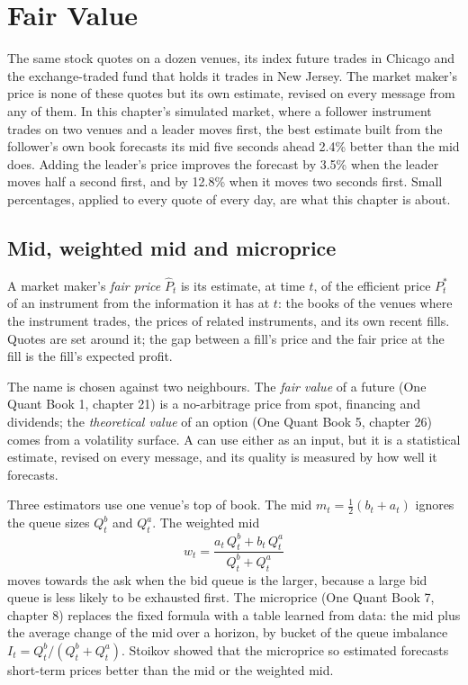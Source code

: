 \chapter{Fair Value}\label{ch:hf:fair-value}

The same stock quotes on a dozen venues, its index future trades in Chicago and the exchange-traded fund that holds it trades in New Jersey. The
market maker's price is none of these quotes but its own estimate, revised on every message from any of them. In this chapter's simulated
market, where a follower instrument trades on two venues and a leader moves first, the best estimate built from the follower's own book forecasts
its mid five seconds ahead 2.4\% better than the mid does. Adding the leader's price improves the forecast by 3.5\% when the leader moves half a
second first, and by 12.8\% when it moves two seconds first. Small percentages, applied to every quote of every day, are what this chapter is about.

\section{Mid, weighted mid and microprice}

\begin{definition}\label{def:hf:fair-value:fair}
A market maker's \emph{fair price} $\hat P_t$ is its estimate, at time $t$, of the efficient price $P^\ast_t$ of an instrument
from the information it has at $t$: the books of the venues where the instrument trades, the prices of related instruments, and its own recent fills.
Quotes are set around it; the gap between a fill's price and the fair price at the fill is the fill's expected profit.
\end{definition}

The name is chosen against two neighbours. The \emph{fair value} of a future (One Quant Book 1, chapter 21) is a no-arbitrage price from spot,
financing and dividends; the \emph{theoretical value} of an option (One Quant Book 5, chapter 26) comes from a volatility surface. A  can
use either as an input, but it is a statistical estimate, revised on every message, and its quality is measured by how well it forecasts.

Three estimators use one venue's top of book. The mid $m_t=\tfrac12(b_t+a_t)$ ignores the queue sizes $Q^b_t$ and $Q^a_t$. The weighted mid
\[
w_t=\frac{a_t\,Q^b_t+b_t\,Q^a_t}{Q^b_t+Q^a_t}
\]
moves towards the ask when the bid queue is the larger, because a large bid queue is less likely to be exhausted first. The microprice (One Quant
Book 7, chapter 8) replaces the fixed formula with a table learned from data: the mid plus the average change of the mid over a horizon, by
bucket of the queue imbalance $I_t=Q^b_t/(Q^b_t+Q^a_t)$. Stoikov showed that the microprice so estimated forecasts short-term prices better than the
mid or the weighted mid.

